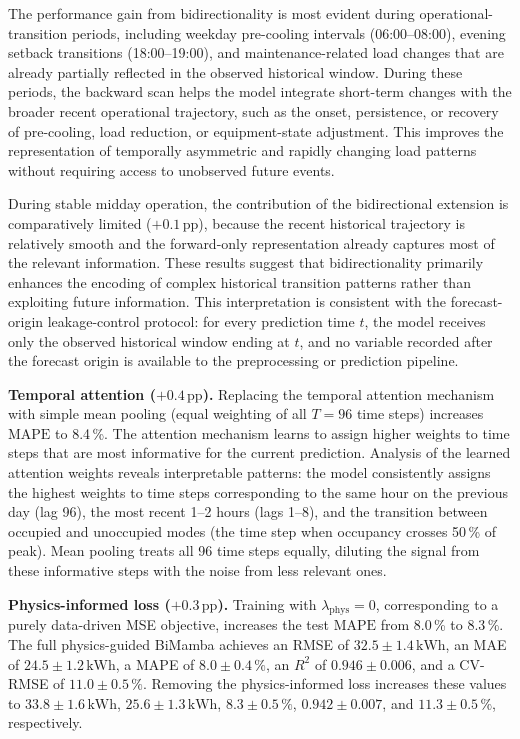 \documentclass[11pt]{article}
\providecommand{\kWh}{\,\text{kWh}}
\providecommand{\pp}{\,\text{pp}}
\providecommand{\MAPE}{\text{MAPE}}
\begin{document}
The performance gain from bidirectionality is most evident during operational-transition periods, including weekday pre-cooling intervals (06:00--08:00), evening setback transitions (18:00--19:00), and maintenance-related load changes that are already partially reflected in the observed historical window. During these periods, the backward scan helps the model integrate short-term changes with the broader recent operational trajectory, such as the onset, persistence, or recovery of pre-cooling, load reduction, or equipment-state adjustment. This improves the representation of temporally asymmetric and rapidly changing load patterns without requiring access to unobserved future events.

During stable midday operation, the contribution of the bidirectional extension is comparatively limited ($+0.1\pp$), because the recent historical trajectory is relatively smooth and the forward-only representation already captures most of the relevant information. These results suggest that bidirectionality primarily enhances the encoding of complex historical transition patterns rather than exploiting future information. This interpretation is consistent with the forecast-origin leakage-control protocol: for every prediction time $t$, the model receives only the observed historical window ending at $t$, and no variable recorded after the forecast origin is available to the preprocessing or prediction pipeline.

\par\noindent\hspace*{2em}\textbf{Temporal attention ($+0.4\pp$).}
Replacing the temporal attention mechanism with simple mean pooling (equal weighting of all $T=96$ time steps) increases $\MAPE$ to 8.4\,\%. The attention mechanism learns to assign higher weights to time steps that are most informative for the current prediction. Analysis of the learned attention weights reveals interpretable patterns: the model consistently assigns the highest weights to time steps corresponding to the same hour on the previous day (lag 96), the most recent 1–2 hours (lags 1–8), and the transition between occupied and unoccupied modes (the time step when occupancy crosses 50\,\% of peak). Mean pooling treats all 96 time steps equally, diluting the signal from these informative steps with the noise from less relevant ones.

\par\noindent\hspace*{2em}\textbf{Physics-informed loss ($+0.3\pp$).}
Training with $\lambda_{\mathrm{phys}}=0$, corresponding to a purely data-driven MSE objective, increases the test $\MAPE$ from 8.0\,\% to 8.3\,\%. The full physics-guided BiMamba achieves an RMSE of $32.5 \pm 1.4\kWh$, an MAE of $24.5 \pm 1.2\kWh$, a MAPE of $8.0 \pm 0.4\,\%$, an $R^2$ of $0.946 \pm 0.006$, and a CV-RMSE of $11.0 \pm 0.5\,\%$. Removing the physics-informed loss increases these values to $33.8 \pm 1.6\kWh$, $25.6 \pm 1.3\kWh$, $8.3 \pm 0.5\,\%$, $0.942 \pm 0.007$, and $11.3 \pm 0.5\,\%$, respectively.
\end{document}
